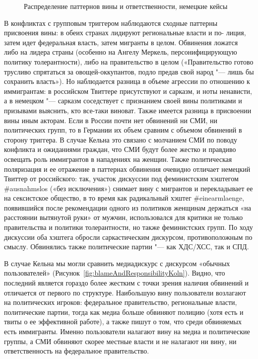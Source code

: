 \begin{figure}[ht]
	\caption{Распределение паттернов вины и ответственности, немецкие кейсы}\label{fig:blameAndResponsibilityGermany}
\end{figure}

В конфликтах с групповым триггером наблюдаются сходные паттерны присвоения вины: в обеих странах лидируют региональные власти и по- лиция, затем идет федеральная власть, затем мигранты в целом. Обвинения ложатся либо на лидера страны (особенно на Ангелу Меркель, персонифицирующую политику толерантности), либо на правительство в целом («Правительство готово трусливо спрятаться за овощей-оккупантов, подло предав свой народ "--- лишь бы сохранить власть»). Но наблюдается разница в объеме агрессии по отношению к иммигрантам: в российском Твиттере присутствуют и сарказм, и ноты ненависти, а в немецком "--- сарказм соседствует с признанием своей вины политиками и призывами выяснить, кто все-таки виноват. Также имеется разница в присвоении вины иным акторам. Если в России почти нет обвинений ни СМИ, ни политических групп, то в Германии их объем сравним с объемом обвинений в сторону триггера. В случае Кельна это связано с молчанием СМИ по поводу конфликта и ожиданиями граждан, что СМИ будут более жестко и правдиво освещать роль иммигрантов в нападениях на женщин. Также политическая поляризация и ее отражение в паттернах обвинения очевидно отличает немецкий Твиттер от российского: так, участок дискуссии под феминистским хэштегом \#ausnahmslos («без исключения») снимает вину с мигрантов и перекладывает ее на сексистское общество, в то время как радикальный хэштег \#einearmlaenge, появившийся после рекомендации одного из политиков женщинам держаться «на расстоянии вытянутой руки» от мужчин, использовался для критики не только правительства и политики толерантности, но также феминистских групп. По ходу дискуссии оба хэштега обросли саркастическим дискурсом, противоположным по смыслу. Обвинялись также политические партии "--- как ХДС/ХСС, так и СПД.

В случае Кельна мы могли сравнить медиадискурс с дискурсом «обычных пользователей» (Рисунок~\cref{fig:blameAndResponsibilityKoln}). Видно, что последний является гораздо более жестким с точки зрения наличия обвинений и отличается от первого по структуре. Наибольшую вину пользователи возлагают на политических игроков: федеральное правительство, региональные власти, политические партии, тогда как медиа больше обвиняют полицию (хотя есть и твиты о ее эффективной работе), а также пишут о том, что среди обвиняемых есть иммигранты. Именно пользователи налагают вину на медиа и политические группы, а СМИ обвиняют скорее местные власти и не налагают ни вину, ни ответственность на федеральное правительство.

